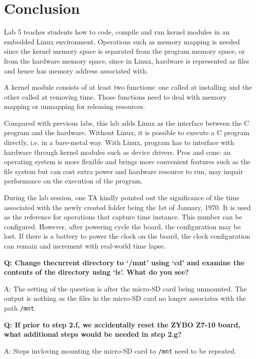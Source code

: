\documentclass[11pt,letterpaper,titlepage]{article}
\begin{document}
\newpage

\part{Conclusion}

Lab 5 teaches students how to code, compile and run kernel modules in an embedded Linux environment. Operations such as memory mapping is needed since the kernel memory space is separated from the program memory space, or from the hardware memory space, since in Linux, hardware is represented as files and hence has memory address associated with.

A kernel module consists of at least two functions: one called at installing and the other called at removing time. Those functions need to deal with memory mapping or unmapping for releasing resources. 

Compared with previous labs, this lab adds Linux as the interface between the C program and the hardware. Without Linux, it is possible to execute a C program directly, i.e. in a bare-metal way. With Linux, program has to interface with hardware through kernel modules such as device drivers. Pros and cons: an operating system is more flexible and brings more convenient features such as the file system but can cost extra power and hardware resource to run, may impair performance on the execution of the program.

During the lab session, one TA kindly pointed out the significance of the time associated with the newly created folder being the 1st of January, 1970. It is used as the reference for operations that capture time instance. This number can be configured. However, after powering cycle the board, the configuration may be lost. If there is a battery to power the clock on the board, the clock configuration can remain and increment with real-world time lapse.

\textbf{Q: Change thecurrent directory to `/mnt' using `cd' and examine the contents of the directory using `ls'. What do you see?}

A: The setting of the question is after the micro-SD card being unmounted. The output is nothing as the files in the micro-SD card no longer associates with the path \verb|/mnt|.

\textbf{Q: If prior to step 2.f, we accidentally reset the ZYBO Z7-10 board, what additional steps would be
needed in step 2.g?}

A: Steps invloving mounting the micro-SD card to \verb|/mnt| need to be repeated.
\end{document}
